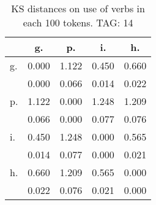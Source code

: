 \begin{table}[h!]
\begin{center}
\begin{tabular}{| l | c | c | c | c |}\hline
 & g. & p. & i. & h. \\\hline
g. & 0.000  & 1.122  & 0.450  & 0.660 \\\hline
 & 0.000  & 0.066  & 0.014  & 0.022 \\\hline
p. & 1.122  & 0.000  & 1.248  & 1.209 \\\hline
 & 0.066  & 0.000  & 0.077  & 0.076 \\\hline
i. & 0.450  & 1.248  & 0.000  & 0.565 \\\hline
 & 0.014  & 0.077  & 0.000  & 0.021 \\\hline
h. & 0.660  & 1.209  & 0.565  & 0.000 \\\hline
 & 0.022  & 0.076  & 0.021  & 0.000 \\\hline
\end{tabular}
\caption{KS distances on use of verbs in each 100 tokens. TAG: 14}
\end{center}
\end{table}